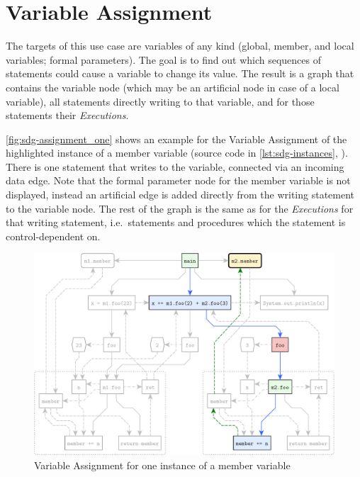 \section{Variable Assignment}

The targets of this use case are variables of any kind (global, member, and local variables; formal parameters). The 
goal is to find out which sequences of statements could cause a variable to change its value. The result is a graph 
that contains the variable node (which may be an artificial node in case of a local variable), all statements directly 
writing to that variable, and for those statements their \emph{Executions}.

\autoref{fig:sdg-assignment_one} shows an example for the Variable Assignment of the highlighted instance of a member 
variable (source code in \autoref{lst:sdg-instances}, ). There is one statement that 
writes to the variable, connected via an incoming data edge. Note that the formal parameter node for the member 
variable is not displayed, instead an artificial edge is added directly from the writing statement to the variable 
node. The rest of the graph is the same as for the \emph{Executions} for that writing statement, i.e.\ statements and 
procedures which the statement is control-dependent on.

\begin{figure}[htbp]
  \centering
    \includegraphics[scale=0.6]{sdgs/assignment_one}
  \caption{Variable Assignment for one instance of a member variable}
  \label{fig:sdg-assignment_one}
\end{figure}

